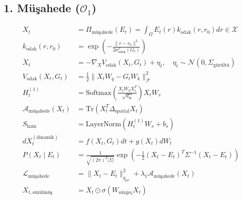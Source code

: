 \documentclass[11pt, a4paper]{article}
\begin{document}
\subsection{1. Müşahede ($\mathcal{O}_1$)}
\begin{align}
X_t &= \Pi_{\text{müşahede}}(E_t) = \int_{\Omega} E_t(r) k_{\text{odak}}(r, r_0) dr \in \mathcal{X} \\
k_{\text{odak}}(r, r_0) &= \exp\left( -\frac{\|r - r_0\|^2}{2 \sigma_{\text{odak}}^2(G_t)} \right) \\
\dot{X}_t &= -\nabla_{X} V_{\text{odak}}(X_t, G_t) + \eta_t, \quad \eta_t \sim \mathcal{N}(0, \Sigma_{\text{gürültü}}) \\
V_{\text{odak}}(X_t, G_t) &= \frac{1}{2} \|X_t W_q - G_t W_k\|_{\mathcal{F}}^2 \\
H_t^{(1)} &= \text{Softmax}\left(\frac{X_t W_q X_t^T}{\sqrt{d_{\text{in}}}}\right) X_t W_v \\
\mathcal{A}_{\text{müşahede}}(X_t) &= \text{Tr}(X_t^T \Delta_{\text{spatial}} X_t) \\
S_{\text{ham}} &= \text{LayerNorm}(H_t^{(1)} W_s + b_s) \\
d X_t^{(\text{dinamik})} &= f(X_t, G_t)dt + g(X_t)dW_t \\
P(X_t \mid E_t) &= \frac{1}{\sqrt{(2\pi)^d |\Sigma|}} \exp\left( -\frac{1}{2}(X_t - E_t)^T \Sigma^{-1} (X_t - E_t) \right) \\
\mathcal{L}_{\text{müşahede}} &= \| X_t - E_t \|_{g_{\mu\nu}}^2 + \lambda_1 \mathcal{A}_{\text{müşahede}}(X_t) \\
X_{t, \text{süzülmüş}} &= X_t \odot \sigma(W_{\text{süzgeç}} X_t)
\end{align}
\end{document}
